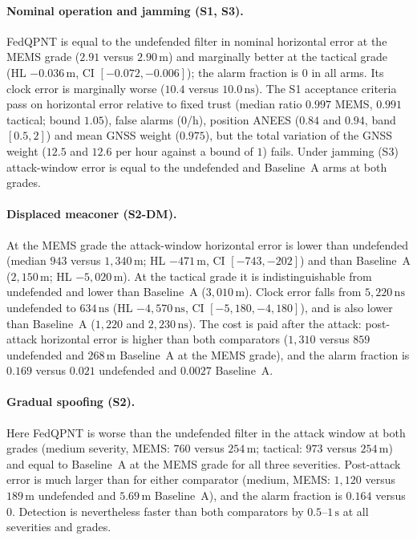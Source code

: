 \documentclass[12pt,a4paper]{article}
\begin{document}
\paragraph{Nominal operation and jamming (S1, S3).} FedQPNT is equal to the undefended filter in nominal horizontal error at the MEMS grade ($2.91$ versus $2.90\,\mathrm{m}$) and marginally better at the tactical grade (HL $-0.036\,\mathrm{m}$, CI $[-0.072,-0.006]$); the alarm fraction is $0$ in all arms. Its clock error is marginally worse ($10.4$ versus $10.0\,\mathrm{ns}$). The S1 acceptance criteria pass on horizontal error relative to fixed trust (median ratio $0.997$ MEMS, $0.991$ tactical; bound $1.05$), false alarms ($0$/h), position ANEES ($0.84$ and $0.94$, band $[0.5,2]$) and mean GNSS weight ($0.975$), but the total variation of the GNSS weight ($12.5$ and $12.6$ per hour against a bound of $1$) fails. Under jamming (S3) attack-window error is equal to the undefended and Baseline~A arms at both grades.

\paragraph{Displaced meaconer (S2-DM).} At the MEMS grade the attack-window horizontal error is lower than undefended (median $943$ versus $1{,}340\,\mathrm{m}$; HL $-471\,\mathrm{m}$, CI $[-743,-202]$) and than Baseline~A ($2{,}150\,\mathrm{m}$; HL $-5{,}020\,\mathrm{m}$). At the tactical grade it is indistinguishable from undefended and lower than Baseline~A ($3{,}010\,\mathrm{m}$). Clock error falls from $5{,}220\,\mathrm{ns}$ undefended to $634\,\mathrm{ns}$ (HL $-4{,}570\,\mathrm{ns}$, CI $[-5{,}180,-4{,}180]$), and is also lower than Baseline~A ($1{,}220$ and $2{,}230\,\mathrm{ns}$). The cost is paid after the attack: post-attack horizontal error is higher than both comparators ($1{,}310$ versus $859$ undefended and $268\,\mathrm{m}$ Baseline~A at the MEMS grade), and the alarm fraction is $0.169$ versus $0.021$ undefended and $0.0027$ Baseline~A.

\paragraph{Gradual spoofing (S2).} Here FedQPNT is worse than the undefended filter in the attack window at both grades (medium severity, MEMS: $760$ versus $254\,\mathrm{m}$; tactical: $973$ versus $254\,\mathrm{m}$) and equal to Baseline~A at the MEMS grade for all three severities. Post-attack error is much larger than for either comparator (medium, MEMS: $1{,}120$ versus $189\,\mathrm{m}$ undefended and $5.69\,\mathrm{m}$ Baseline~A), and the alarm fraction is $0.164$ versus $0$. Detection is nevertheless faster than both comparators by $0.5$--$1\,\mathrm{s}$ at all severities and grades.
\end{document}
